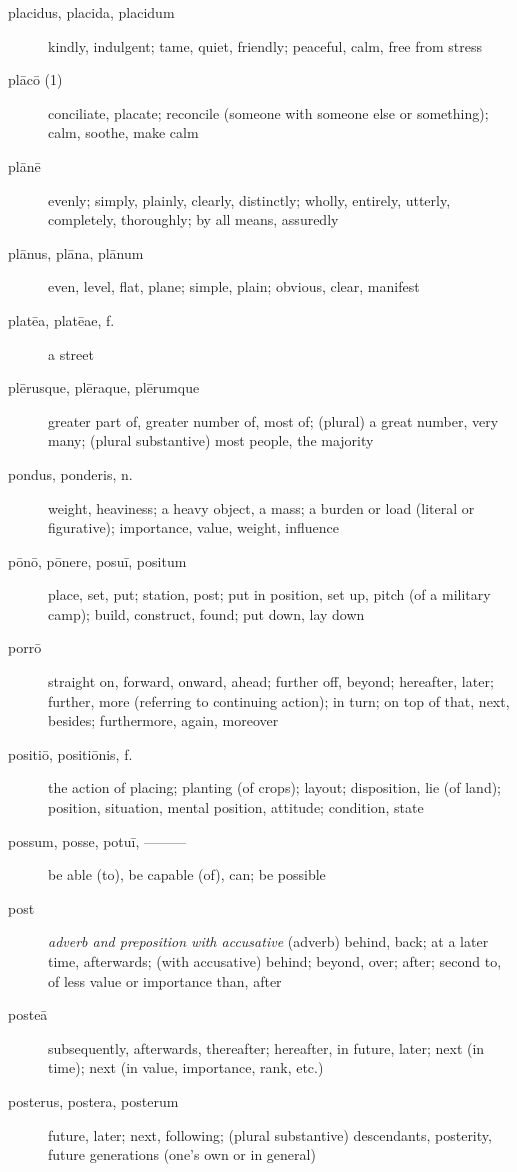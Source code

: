 \begin{description}
    \item[placidus, placida, placidum] kindly, indulgent; tame, quiet, friendly; peaceful, calm, free from stress
    \item[plācō (1)] conciliate, placate; reconcile (someone with someone else or something); calm, soothe, make calm
    \item[plānē] evenly; simply, plainly, clearly, distinctly; wholly, entirely, utterly, completely, thoroughly; by all means, assuredly
    \item[plānus, plāna, plānum] even, level, flat, plane; simple, plain; obvious, clear, manifest
    \item[platēa, platēae, f.] a street
    \item[plērusque, plēraque, plērumque] \marginnote{*}greater part of, greater number of, most of; (plural) a great number, very many; (plural substantive) most people, the majority
    \item[pondus, ponderis, n.] \marginnote{*}weight, heaviness; a heavy object, a mass; a burden or load (literal or figurative); importance, value, weight, influence
    \item[pōnō, pōnere, posuī, positum] \marginnote{*}place, set, put; station, post; put in position, set up, pitch (of a military camp); build, construct, found; put down, lay down
    \item[porrō] straight on, forward, onward, ahead; further off, beyond; hereafter, later; further, more (referring to continuing action); in turn; on top of that, next, besides; furthermore, again, moreover
    \item[positiō, positiōnis, f.] the action of placing; planting (of crops); layout; disposition, lie (of land); position, situation, mental position, attitude; condition, state
    \item[possum, posse, potuī, ———] \marginnote{*}be able (to), be capable (of), can; be possible
    \item[post] \marginnote{*}\textit{adverb and preposition with accusative} (adverb) behind, back; at a later time, afterwards; (with accusative) behind; beyond, over; after; second to, of less value or importance than, after 
    \item[posteā] \marginnote{*}subsequently, afterwards, thereafter; hereafter, in future, later; next (in time); next (in value, importance, rank, etc.)
    \item[posterus, postera, posterum] \marginnote{*}future, later; next, following; (plural substantive) descendants, posterity, future generations (one's own or in general)

\end{description}
